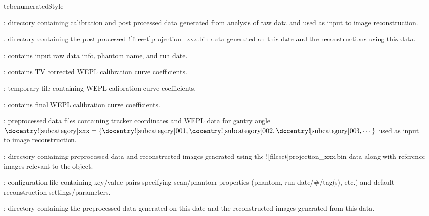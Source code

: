 \begin{tcbenvironment}
\begin{tcbparbox}{tcbenumeratedStyle}
\begin{ThinEnum}
\begin{ThinEnum}
\begin{ThinEnum}
\begin{ThinEnum}
\begin{ThinEnum}
\begin{ThinEnum}
                        \end{ThinEnum}
                        \item {} : directory containing calibration and post processed data generated from analysis of raw data and used as input to image reconstruction.
                        \begin{ThinEnum}
                            \item {} : directory containing the post processed \docentry![fileset]{projection\_xxx.bin} data generated on this date and the reconstructions using this data.
                            \begin{ThinEnum}
                                \item {} : contains input raw data info, phantom name, and run date.
                                \item {} : contains TV corrected WEPL calibration curve coefficients.
                        \item {} : temporary file containing WEPL calibration curve coefficients.
                                    \item {} : contains final WEPL calibration curve coefficients.
                                \item {} : preprocessed data files containing tracker coordinates and WEPL data for gantry angle $\text{\docentry![subcategory]{xxx}} =\{\text{\docentry![subcategory]{001}}, \text{\docentry![subcategory]{002}}, \text{\docentry![subcategory]{003}}, \cdots\}$ used as input to image reconstruction.
                                \item {} : directory containing preprocessed data and reconstructed images generated using the \docentry![fileset]{projection\_xxx.bin} data along with reference images relevant to the object.
                                    \begin{ThinEnum}
                                        \item {} : configuration file containing key/value pairs specifying scan/phantom properties (phantom, run date/\#/tag(s), etc.) and default reconstruction settings/parameters.
                                    \item {} : directory containing the preprocessed data generated on this date and the reconstructed images generated from this data.

\end{ThinEnum}
\end{ThinEnum}
\end{ThinEnum}
\end{ThinEnum}
\end{ThinEnum}
\end{ThinEnum}
\end{ThinEnum}
\end{ThinEnum}
\end{tcbparbox}
\end{tcbenvironment}
